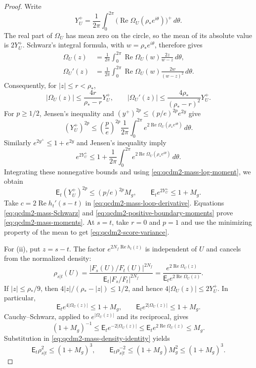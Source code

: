 \documentclass[11pt,letterpaper,reqno]{amsart}
\theoremstyle{definition}
\theoremstyle{remark}
\begin{document}
\begin{proof}
Write
\[
 Y_U^+=\frac1{2\pi}\int_0^{2\pi}
       \bigl(\operatorname{Re}\Omega_U(\rho_*e^{i\theta})\bigr)^+
                                                    \,d\theta.
\]
The real part of $\Omega_U$ has mean zero on the circle, so
the mean of its absolute value is $2Y_U^+$. Schwarz's integral
formula, with $w=\rho_*e^{i\theta}$, therefore gives
\begin{align*}
 \Omega_U(z)&=\frac1{2\pi}\int_0^{2\pi}
       \operatorname{Re}\Omega_U(w)\frac{2z}{w-z}\,d\theta,\\
 \Omega_U'(z)&=\frac1{2\pi}\int_0^{2\pi}
       \operatorname{Re}\Omega_U(w)\frac{2w}{(w-z)^2}\,d\theta.
\end{align*}
Consequently, for $|z|\le r<\rho_*$,
\begin{equation}\label{eq:qcdm2-mass-Schwarz}
 |\Omega_U(z)|\le\frac{4r}{\rho_*-r}Y_U^+,
 \qquad
 |\Omega_U'(z)|\le\frac{4\rho_*}{(\rho_*-r)^2}Y_U^+.
\end{equation}
For $p\ge1/2$, Jensen's inequality and
$(y^+)^{2p}\le(p/e)^{2p}e^{2y}$ give
\[
 (Y_U^+)^{2p}\le\left(\frac pe\right)^{2p}
       \frac1{2\pi}\int_0^{2\pi}
             e^{2\operatorname{Re}\Omega_U(\rho_*e^{i\theta})}
                                                        \,d\theta.
\]
Similarly $e^{2y^+}\le1+e^{2y}$ and Jensen's inequality imply
\[
 e^{2Y_U^+}\le1+\frac1{2\pi}\int_0^{2\pi}
             e^{2\operatorname{Re}\Omega_U(\rho_*e^{i\theta})}
                                                        \,d\theta.
\]
Integrating these nonnegative bounds and using
\eqref{eq:qcdm2-mass-log-moment}, we obtain
\begin{equation}\label{eq:qcdm2-positive-boundary-moments}
 \mathsf E_t(Y_U^+)^{2p}\le(p/e)^{2p}M_g,
 \qquad \mathsf E_t e^{2Y_U^+}\le1+M_g.
\end{equation}
Take $c=2\operatorname{Re}h_t'(s-t)$ in
\eqref{eq:qcdm2-mass-loop-derivative}. Equations
\eqref{eq:qcdm2-mass-Schwarz} and
\eqref{eq:qcdm2-positive-boundary-moments} prove
\eqref{eq:qcdm2-mass-moments}. At $s=t$, take $r=0$ and
$p=1$ and use the minimizing property of the mean to get
\eqref{eq:qcdm2-score-variance}.

For (ii), put $z=s-t$. The factor $e^{2N_f\operatorname{Re}h_t(z)}$
is independent of $U$ and cancels from the normalized density:
\begin{equation}\label{eq:qcdm2-mass-density-identity}
 \rho_{s|t}(U)=\frac{|F_s(U)/F_t(U)|^{2N_f}}
                        {\mathsf E_t|F_s/F_t|^{2N_f}}
       =\frac{e^{2\operatorname{Re}\Omega_U(z)}}
                    {\mathsf E_t e^{2\operatorname{Re}\Omega_U(z)}}.
\end{equation}
If $|z|\le\rho_*/9$, then
$4|z|/(\rho_*-|z|)\le1/2$, and hence
$4|\Omega_U(z)|\le2Y_U^+$. In particular,
\[
 \mathsf E_t e^{4|\Omega_U(z)|}\le1+M_g,
 \qquad
 \mathsf E_t e^{2|\Omega_U(z)|}\le1+M_g.
\]
Cauchy--Schwarz, applied to $e^{|\Omega_U(z)|}$ and its
reciprocal, gives
\[
 (1+M_g)^{-1}
 \le\mathsf E_t e^{-2|\Omega_U(z)|}
 \le\mathsf E_t e^{2\operatorname{Re}\Omega_U(z)}
 \le M_g.
\]
Substitution in \eqref{eq:qcdm2-mass-density-identity} yields
\[
 \mathsf E_t\rho_{s|t}^2\le(1+M_g)^3,
 \qquad
 \mathsf E_t\rho_{s|t}^{-2}\le(1+M_g)M_g^2
                                      \le(1+M_g)^3.
\]


\end{proof}
\end{document}

